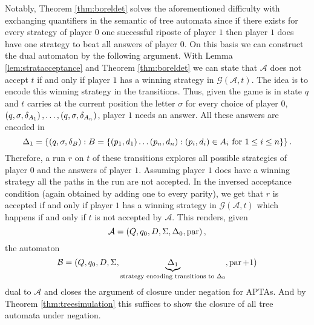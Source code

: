 Notably, Theorem \ref{thm:boreldet}
solves the aforementioned difficulty with exchanging quantifiers in the 
semantic of tree automata since if there exists for every strategy of player 
$0$ one successful riposte of player $1$ then player $1$ does have one strategy
to beat all answers of player $0$. On this basis we can construct the dual 
automaton by the following argument. With Lemma \ref{lem:stratacceptance} and 
Theorem \ref{thm:boreldet} we can state that $\mathcal{A}$ does not 
accept $t$ if and only if player $1$ has a winning strategy in 
$\mathcal{G}(\mathcal{A},t)$. The idea is to encode this winning strategy in
the transitions. Thus, given the game is in state $q$ and $t$ carries at the
current position the letter $\sigma$ for every choice of player $0$,
$\left(q,\sigma,\delta_{A_{1}}\right),\dots,\left(q,\sigma,\delta_{A_{n}}\right)$, player
$1$ needs an answer. All these answers are encoded in 
\begin{equation*}
  \Delta_{1} = \left\{
    \left(q,\sigma, \delta_{B}\right):B = \left\{
      \left(p_{1}, d_{1}\right)\dots\left(p_{n},d_{n}\right):\left(p_{i}, d_{i}\right)\in 
        A_{i} \text{ for }1\leq i\leq n
    \right\}
  \right\}.
\end{equation*}
Therefore, a run $r$ on $t$ of these transitions explores all possible 
strategies of player $0$ and the answers of player $1$. Assuming player $1$ 
does have a winning strategy all the paths in the run are not accepted. In the 
inversed acceptance condition (again obtained by adding one to every parity), 
we get that $r$ is accepted if and only if player $1$ has a winning strategy
in $\mathcal{G}(\mathcal{A}, t)$ which happens if and only if $t$ is not 
accepted by $\mathcal{A}$. This renders, given
\begin{equation*}
  \mathcal{A} = \left(Q, q_{0}, D, \Sigma, \Delta_{0}, \operatorname{par}\right),
\end{equation*}
the automaton
\begin{equation*}
  \mathcal{B} = (Q, q_{0}, D, \Sigma, 
  \underbrace{\Delta_{1}}_{\text{strategy encoding transitions to }\Delta_{0}}, 
  \operatorname{par} + 1)
\end{equation*}
dual to $\mathcal{A}$ and closes the argument of closure under negation for
\acp{APTA}. And by Theorem \ref{thm:treesimulation} this suffices to show the
closure of all tree automata under negation.
